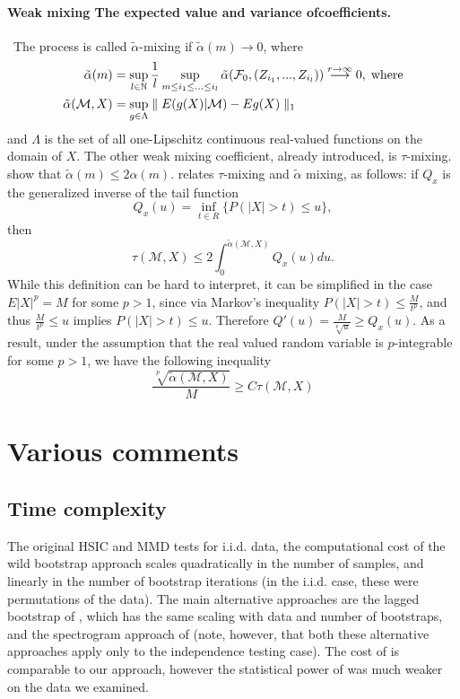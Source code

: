 \paragraph{Weak mixing The expected value and variance ofcoefficients.}\
The process is called $\tilde \alpha$-mixing if $\tilde \alpha(m) \rightarrow 0$, where 
\begin{align*}
\tilde \alpha(m)  &= \sup_{l \in \mathbb{N}} \frac 1 l \sup_{ m \leq i_1 \leq ... \leq i_l} \tilde \alpha( \mathcal F_0,(Z_{i_1},...,Z_{i_l}) )  \overset{r \to \infty}{\longrightarrow} 0,\;\text{where} \\
\tilde \alpha(\mathcal{M},X)  &=    \sup_{g \in \Lambda} \parallel  E(g(X)|\mathcal{M})  - E g(X) \parallel_{1} 
\end{align*}
and $\Lambda$ is the set of all one-Lipschitz continuous real-valued functions on the domain of $X$.
The other weak mixing coefficient, already introduced,  is $\tau$-mixing. \cite[Remark 2.4]{dedecker2007weak} show that $\tilde \alpha(m) \leq 2\alpha(m)$. \cite[Proposition 2]{dedecker2005new} relates $\tau$-mixing and $\tilde \alpha$ mixing, as follows: if $Q_x$ is the generalized inverse of the tail function
\[
 Q_x(u) = \inf_{t \in R} \{  P(|X| > t) \leq u\},  
\]
then
\[
 \tau(\mathcal{M},X) \leq 2 \int_{0}^{\tilde \alpha(\mathcal{M},X)}  Q_x(u) du.
\]
While this definition can be hard to interpret, it can be simplified in the case $E|X|^p=M$  for some $p>1$, since via Markov's inequality $P(|X|>t) \leq \frac{M}{t^p}$, and thus $\frac{M}{t^p} \leq u $ implies $P(|X|>t) \leq u$. Therefore $Q'(u) = \frac{M}{\sqrt[p]{u}} \geq Q_x(u)$. As a result, under the assumption that the real valued random variable is $p$-integrable for some $p>1$, we have the following inequality 
\[
 \frac{ \sqrt[p]{\tilde   \alpha(\mathcal{M},X)}}{M}  \geq C  \tau(\mathcal{M},X) 
\]




\section{Various comments}

\subsection{Time complexity}
The original HSIC and MMD tests for i.i.d. data, the computational cost of the wild bootstrap approach scales quadratically in the number of samples, and linearly in the number of bootstrap iterations (in the i.i.d. case, these were permutations of the data). The main alternative approaches are the lagged bootstrap of \cite{chwialkowski2014kernel}, which has the same scaling with data and number of bootstraps, and the spectrogram approach of \cite{besserve_statistical_2013} (note, however, that both these alternative approaches apply only to the independence testing case). The cost of \cite{besserve_statistical_2013} is comparable to our approach, however the statistical power of \cite{besserve_statistical_2013} was much weaker on the data we examined.